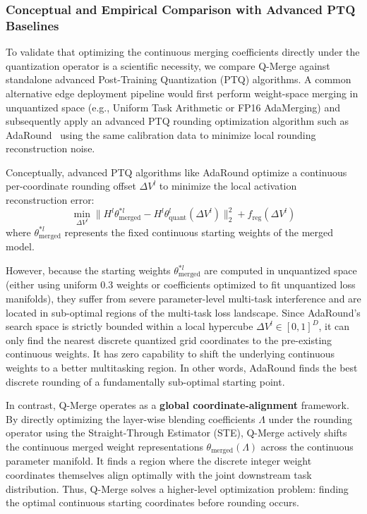 \subsubsection{Conceptual and Empirical Comparison with Advanced PTQ Baselines}
To validate that optimizing the continuous merging coefficients directly under the quantization operator is a scientific necessity, we compare Q-Merge against standalone advanced Post-Training Quantization (PTQ) algorithms. A common alternative edge deployment pipeline would first perform weight-space merging in unquantized space (e.g., Uniform Task Arithmetic or FP16 AdaMerging) and subsequently apply an advanced PTQ rounding optimization algorithm such as AdaRound~\cite{nagel2020adaround} using the same calibration data to minimize local rounding reconstruction noise.

Conceptually, advanced PTQ algorithms like AdaRound optimize a continuous per-coordinate rounding offset $\Delta V^l$ to minimize the local activation reconstruction error:
\begin{equation}
    \min_{\Delta V^l} \| H^l \theta^{*l}_{\text{merged}} - H^l \theta^l_{\text{quant}}(\Delta V^l) \|_2^2 + f_{\text{reg}}(\Delta V^l)
\end{equation}
where $\theta^{*l}_{\text{merged}}$ represents the fixed continuous starting weights of the merged model. 

However, because the starting weights $\theta^{*l}_{\text{merged}}$ are computed in unquantized space (either using uniform 0.3 weights or coefficients optimized to fit unquantized loss manifolds), they suffer from severe parameter-level multi-task interference and are located in sub-optimal regions of the multi-task loss landscape. Since AdaRound's search space is strictly bounded within a local hypercube $\Delta V^l \in [0, 1]^D$, it can only find the nearest discrete quantized grid coordinates to the pre-existing continuous weights. It has zero capability to shift the underlying continuous weights to a better multitasking region. In other words, AdaRound finds the best discrete rounding of a fundamentally sub-optimal starting point.

In contrast, Q-Merge operates as a \textbf{global coordinate-alignment} framework. By directly optimizing the layer-wise blending coefficients $\Lambda$ under the rounding operator using the Straight-Through Estimator (STE), Q-Merge actively shifts the continuous merged weight representations $\theta_{\text{merged}}(\Lambda)$ across the continuous parameter manifold. It finds a region where the discrete integer weight coordinates themselves align optimally with the joint downstream task distribution. Thus, Q-Merge solves a higher-level optimization problem: finding the optimal continuous starting coordinates before rounding occurs.

